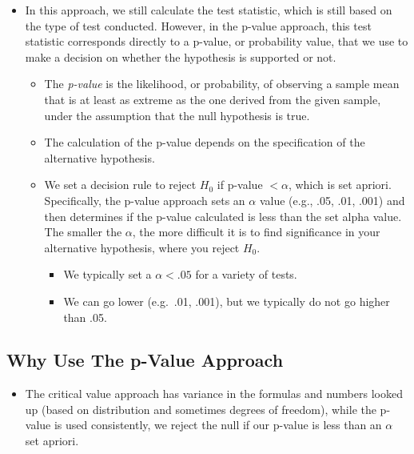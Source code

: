 \documentclass[
  letterpaper,
  DIV=11,
  numbers=noendperiod]{scrreprt}
\providecommand{\tightlist}{%
  \setlength{\itemsep}{0pt}\setlength{\parskip}{0pt}}\usepackage{longtable,booktabs,array}
\begin{document}
\begin{itemize}
\tightlist
\item
  In this approach, we still calculate the test statistic, which is
  still based on the type of test conducted. However, in the p-value
  approach, this test statistic corresponds directly to a p-value, or
  probability value, that we use to make a decision on whether the
  hypothesis is supported or not.

  \begin{itemize}
  \tightlist
  \item
    The \emph{p-value} is the likelihood, or probability, of observing a
    sample mean that is at least as extreme as the one derived from the
    given sample, under the assumption that the null hypothesis is true.
  \item
    The calculation of the p-value depends on the specification of the
    alternative hypothesis.
  \item
    We set a decision rule to reject \(H_0\) if p-value \(< \alpha\),
    which is set apriori. Specifically, the p-value approach sets an
    \(\alpha\) value (e.g., .05, .01, .001) and then determines if the
    p-value calculated is less than the set alpha value. The smaller the
    \(\alpha\), the more difficult it is to find significance in your
    alternative hypothesis, where you reject \(H_0\).

    \begin{itemize}
    \tightlist
    \item
      We typically set a \(\alpha < .05\) for a variety of tests.
    \item
      We can go lower (e.g.~.01, .001), but we typically do not go
      higher than .05.
    \end{itemize}
  \end{itemize}
\end{itemize}

\subsection{Why Use The p-Value
Approach}\label{why-use-the-p-value-approach}

\begin{itemize}
\tightlist
\item
  The critical value approach has variance in the formulas and numbers
  looked up (based on distribution and sometimes degrees of freedom),
  while the p-value is used consistently, we reject the null if our
  p-value is less than an \(\alpha\) set apriori.
\end{itemize}
\end{document}

